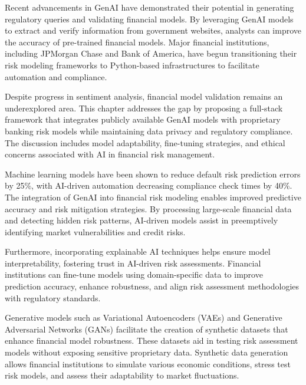 \documentclass[a4paper,headinclude=on,footinclude=on,12pt,oneside]{scrbook}
\begin{document}
	Recent advancements in GenAI have demonstrated their potential in generating regulatory queries and validating financial models. By leveraging GenAI models to extract and verify information from government websites, analysts can improve the accuracy of pre-trained financial models. Major financial institutions, including JPMorgan Chase and Bank of America, have begun transitioning their risk modeling frameworks to Python-based infrastructures to facilitate automation and compliance.
	
	Despite progress in sentiment analysis, financial model validation remains an underexplored area. This chapter addresses the gap by proposing a full-stack framework that integrates publicly available GenAI models with proprietary banking risk models while maintaining data privacy and regulatory compliance. The discussion includes model adaptability, fine-tuning strategies, and ethical concerns associated with AI in financial risk management.
	
	
	Machine learning models have been shown to reduce default risk prediction errors by 25\%, with AI-driven automation decreasing compliance check times by 40\%. The integration of GenAI into financial risk modeling enables improved predictive accuracy and risk mitigation strategies. By processing large-scale financial data and detecting hidden risk patterns, AI-driven models assist in preemptively identifying market vulnerabilities and credit risks.
	
	Furthermore, incorporating explainable AI techniques helps ensure model interpretability, fostering trust in AI-driven risk assessments. Financial institutions can fine-tune models using domain-specific data to improve prediction accuracy, enhance robustness, and align risk assessment methodologies with regulatory standards.
	
	Generative models such as Variational Autoencoders (VAEs) and Generative Adversarial Networks (GANs) facilitate the creation of synthetic datasets that enhance financial model robustness. These datasets aid in testing risk assessment models without exposing sensitive proprietary data. Synthetic data generation allows financial institutions to simulate various economic conditions, stress test risk models, and assess their adaptability to market fluctuations.
	
\end{document}
